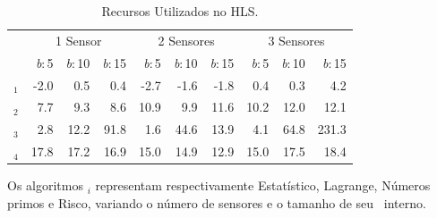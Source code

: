     \begin{table}[h]\centering
        \vspace{-1em}
        \scriptsize
        \caption{Recursos Utilizados no HLS.}
        \begin{tabular}{@{}crrr|rrr|rrr@{}}\toprule
            & \multicolumn{3}{c}{1 Sensor} & \multicolumn{3}{c}{2 Sensores} & \multicolumn{3}{c}{3 Sensores}\\
            \cmidrule{2-10}
            & \textit{b}:\,5 & \textit{b}:\,10 & \textit{b}:\,15 & \textit{b}:\,5 & \textit{b}:\,10 & \textit{b}:\,15 & \textit{b}:\,5 & \textit{b}:\,10 & \textit{b}:\,15 \\
            \midrule
            \A$_1$   & -2.0   &    0.5  &    0.4  &   -2.7  &   -1.6  &   -1.8  &    0.4  &   0.3   &     4.2   \\
            \A$_2$   &  7.7   &    9.3  &    8.6  &   10.9  &    9.9  &   11.6  &   10.2  &   12.0  &    12.1   \\
            \A$_3$   &  2.8   &   12.2  &   91.8  &    1.6  &   44.6  &   13.9  &    4.1  &   64.8  &   231.3   \\
            \A$_4$   & 17.8   &   17.2  &   16.9  &   15.0  &   14.9  &   12.9  &   15.0  &   17.5  &    18.4   \\
            \bottomrule
        \end{tabular}
        \label{tab:iterations}
    \end{table}

    Os algoritmos \A$_i$ representam respectivamente Estatístico, Lagrange, Números primos e Risco, variando o número de sensores e o tamanho de seu \buffer\ interno.
  

